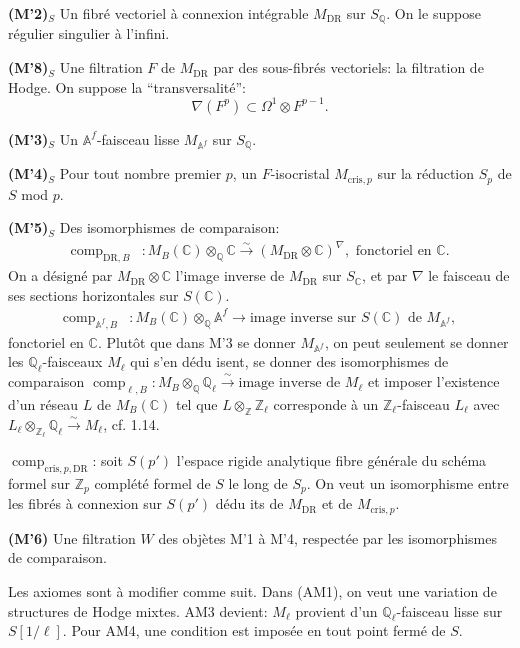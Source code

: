 \documentclass[12pt,a4paper]{article}
\theoremstyle{plain}
\theoremstyle{definition}
\theoremstyle{remark}
\providecommand{\DR}{\mathrm{DR}}
\providecommand{\cris}{\mathrm{cris}}
\providecommand{\comp}{\operatorname{comp}}
\begin{document}
\textbf{(M'2)$_S$} Un fibr\'e vectoriel \`a connexion int\'egrable $M_{\DR}$ sur
$S_\mathbb{Q}$. On le suppose r\'egulier singulier \`a l'infini.

\textbf{(M'8)$_S$} Une filtration $F$ de $M_{\DR}$ par des sous-fibr\'es vectoriels: la
filtration de Hodge. On suppose la ``transversalit\'e'':
\[
\nabla(F^p) \subset \Omega^1 \otimes F^{p-1}.
\]

\textbf{(M'3)$_S$} Un $\mathbb{A}^f$-faisceau lisse $M_{\mathbb{A}^f}$ sur $S_\mathbb{Q}$.

\textbf{(M'4)$_S$} Pour tout nombre premier $p$, un $F$-isocristal $M_{\cris,p}$ sur la
r\'eduction $S_p$ de $S$ mod $p$.

\textbf{(M'5)$_S$} Des isomorphismes de comparaison:
\begin{align*}
\comp_{\DR,B} &: M_B(\mathbb{C}) \otimes_{\mathbb{Q}} \mathbb{C}
\xrightarrow{\sim} (M_{\DR} \otimes \mathbb{C})^\nabla, \text{ fonctoriel en }
\mathbb{C}.
\end{align*}
On a d\'esign\'e par $M_{\DR} \otimes \mathbb{C}$ l'image inverse de $M_{\DR}$ sur
$S_\mathbb{C}$, et par $\nabla$ le faisceau de ses sections horizontales sur
$S(\mathbb{C})$.
\begin{align*}
\comp_{\mathbb{A}^f,B} &: M_B(\mathbb{C}) \otimes_{\mathbb{Q}} \mathbb{A}^f
\longrightarrow \text{image inverse sur } S(\mathbb{C}) \text{ de }
M_{\mathbb{A}^f},
\end{align*}
fonctoriel en $\mathbb{C}$. Plut\^ot que dans M'3 se donner $M_{\mathbb{A}^f}$, on peut
seulement se donner les $\mathbb{Q}_\ell$-faisceaux $M_\ell$ qui s'en d\'edu isent, se
donner des isomorphismes de comparaison $\comp_{\ell,B}: M_B \otimes_{\mathbb{Q}}
\mathbb{Q}_\ell \xrightarrow{\sim} \text{image inverse de } M_\ell$ et imposer l'existence
d'un r\'eseau $L$ de $M_B(\mathbb{C})$ tel que $L \otimes_{\mathbb{Z}} \mathbb{Z}_\ell$
corresponde \`a un $\mathbb{Z}_\ell$-faisceau $L_\ell$ avec $L_\ell \otimes_{\mathbb{Z}_\ell}
\mathbb{Q}_\ell \xrightarrow{\sim} M_\ell$, cf. 1.14.

$\comp_{\cris,p,\DR}$: soit $S(p')$ l'espace rigide analytique fibre g\'en\'erale du
sch\'ema formel sur $\mathbb{Z}_p$ compl\'et\'e formel de $S$ le long de $S_p$. On veut un
isomorphisme entre les fibr\'es \`a connexion sur $S(p')$ d\'edu its de $M_{\DR}$ et de
$M_{\cris,p}$.

\textbf{(M'6)} Une filtration $W$ des obj\`etes M'1 \`a M'4, respect\'ee par les
isomorphismes de comparaison.

Les axiomes sont \`a modifier comme suit. Dans (AM1), on veut une variation de structures
de Hodge mixtes. AM3 devient: $M_\ell$ provient d'un $\mathbb{Q}_\ell$-faisceau lisse sur
$S[1/\ell]$. Pour AM4, une condition est impos\'ee en tout point ferm\'e de $S$.
\end{document}
